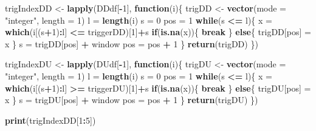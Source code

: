 \documentclass[]{article}
\newenvironment{Shaded}{\begin{snugshade}}{\end{snugshade}}
\newcommand{\KeywordTok}[1]{\textcolor[rgb]{0.13,0.29,0.53}{\textbf{#1}}}
\newcommand{\DataTypeTok}[1]{\textcolor[rgb]{0.13,0.29,0.53}{#1}}
\newcommand{\DecValTok}[1]{\textcolor[rgb]{0.00,0.00,0.81}{#1}}
\newcommand{\StringTok}[1]{\textcolor[rgb]{0.31,0.60,0.02}{#1}}
\newcommand{\ControlFlowTok}[1]{\textcolor[rgb]{0.13,0.29,0.53}{\textbf{#1}}}
\newcommand{\OperatorTok}[1]{\textcolor[rgb]{0.81,0.36,0.00}{\textbf{#1}}}
\newcommand{\NormalTok}[1]{#1}
\begin{document}
\begin{Shaded}
\begin{Highlighting}[]
\NormalTok{trigIndexDD <-}\StringTok{ }\KeywordTok{lapply}\NormalTok{(DDdf[}\OperatorTok{-}\DecValTok{1}\NormalTok{], }\ControlFlowTok{function}\NormalTok{(i)\{}
\NormalTok{  trigDD <-}\StringTok{ }\KeywordTok{vector}\NormalTok{(}\DataTypeTok{mode =} \StringTok{"integer"}\NormalTok{, }\DataTypeTok{length =} \DecValTok{1}\NormalTok{)}
\NormalTok{  l =}\StringTok{ }\KeywordTok{length}\NormalTok{(i)}
\NormalTok{  s =}\StringTok{ }\DecValTok{0}
\NormalTok{  pos =}\StringTok{ }\DecValTok{1}
  \ControlFlowTok{while}\NormalTok{(s }\OperatorTok{<=}\StringTok{ }\NormalTok{l)\{}
\NormalTok{    x =}\StringTok{ }\KeywordTok{which}\NormalTok{(i[(s}\OperatorTok{+}\DecValTok{1}\NormalTok{)}\OperatorTok{:}\NormalTok{l] }\OperatorTok{<=}\StringTok{ }\NormalTok{triggerDD)[}\DecValTok{1}\NormalTok{]}\OperatorTok{+}\NormalTok{s}
    \ControlFlowTok{if}\NormalTok{(}\KeywordTok{is.na}\NormalTok{(x))\{}
      \ControlFlowTok{break}
\NormalTok{    \} }\ControlFlowTok{else}\NormalTok{\{}
\NormalTok{      trigDD[pos] =}\StringTok{ }\NormalTok{x}
\NormalTok{    \}}
\NormalTok{    s =}\StringTok{ }\NormalTok{trigDD[pos] }\OperatorTok{+}\StringTok{ }\NormalTok{window}
\NormalTok{    pos =}\StringTok{ }\NormalTok{pos }\OperatorTok{+}\StringTok{ }\DecValTok{1}
\NormalTok{  \}}
  \KeywordTok{return}\NormalTok{(trigDD)}
\NormalTok{\})}

\NormalTok{trigIndexDU <-}\StringTok{ }\KeywordTok{lapply}\NormalTok{(DUdf[}\OperatorTok{-}\DecValTok{1}\NormalTok{], }\ControlFlowTok{function}\NormalTok{(i)\{}
\NormalTok{  trigDU <-}\StringTok{ }\KeywordTok{vector}\NormalTok{(}\DataTypeTok{mode =} \StringTok{"integer"}\NormalTok{, }\DataTypeTok{length =} \DecValTok{1}\NormalTok{)}
\NormalTok{  l =}\StringTok{ }\KeywordTok{length}\NormalTok{(i)}
\NormalTok{  s =}\StringTok{ }\DecValTok{0}
\NormalTok{  pos =}\StringTok{ }\DecValTok{1}
  \ControlFlowTok{while}\NormalTok{(s }\OperatorTok{<=}\StringTok{ }\NormalTok{l)\{}
\NormalTok{    x =}\StringTok{ }\KeywordTok{which}\NormalTok{(i[(s}\OperatorTok{+}\DecValTok{1}\NormalTok{)}\OperatorTok{:}\NormalTok{l] }\OperatorTok{>=}\StringTok{ }\NormalTok{triggerDU)[}\DecValTok{1}\NormalTok{]}\OperatorTok{+}\NormalTok{s}
    \ControlFlowTok{if}\NormalTok{(}\KeywordTok{is.na}\NormalTok{(x))\{}
      \ControlFlowTok{break}
\NormalTok{    \} }\ControlFlowTok{else}\NormalTok{\{}
\NormalTok{      trigDU[pos] =}\StringTok{ }\NormalTok{x}
\NormalTok{    \}}
\NormalTok{    s =}\StringTok{ }\NormalTok{trigDU[pos] }\OperatorTok{+}\StringTok{ }\NormalTok{window}
\NormalTok{    pos =}\StringTok{ }\NormalTok{pos }\OperatorTok{+}\StringTok{ }\DecValTok{1}
\NormalTok{  \}}
  \KeywordTok{return}\NormalTok{(trigDU)}
\NormalTok{\})}


\KeywordTok{print}\NormalTok{(trigIndexDD[}\DecValTok{1}\OperatorTok{:}\DecValTok{5}\NormalTok{])}
\end{Highlighting}
\end{Shaded}
\end{document}
